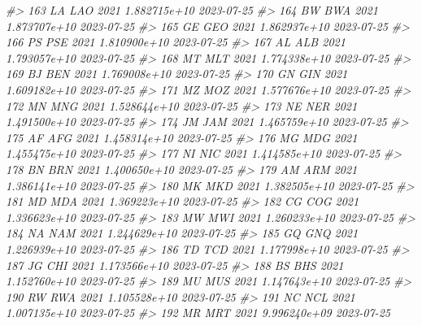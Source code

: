 \documentclass[
  xelatex, ja=standard]{bxjsbook}
\newenvironment{Shaded}{\begin{snugshade}}{\end{snugshade}}
\newcommand{\CommentTok}[1]{\textcolor[rgb]{0.56,0.35,0.01}{\textit{#1}}}
\theoremstyle{definition}
\theoremstyle{definition}
\theoremstyle{definition}
\theoremstyle{definition}
\theoremstyle{remark}
\begin{document}
\begin{Shaded}
\begin{Highlighting}[]
\CommentTok{\#\textgreater{} 163    LA   LAO 2021 1.882715e+10         2023{-}07{-}25}
\CommentTok{\#\textgreater{} 164    BW   BWA 2021 1.873707e+10         2023{-}07{-}25}
\CommentTok{\#\textgreater{} 165    GE   GEO 2021 1.862937e+10         2023{-}07{-}25}
\CommentTok{\#\textgreater{} 166    PS   PSE 2021 1.810900e+10         2023{-}07{-}25}
\CommentTok{\#\textgreater{} 167    AL   ALB 2021 1.793057e+10         2023{-}07{-}25}
\CommentTok{\#\textgreater{} 168    MT   MLT 2021 1.774338e+10         2023{-}07{-}25}
\CommentTok{\#\textgreater{} 169    BJ   BEN 2021 1.769008e+10         2023{-}07{-}25}
\CommentTok{\#\textgreater{} 170    GN   GIN 2021 1.609182e+10         2023{-}07{-}25}
\CommentTok{\#\textgreater{} 171    MZ   MOZ 2021 1.577676e+10         2023{-}07{-}25}
\CommentTok{\#\textgreater{} 172    MN   MNG 2021 1.528644e+10         2023{-}07{-}25}
\CommentTok{\#\textgreater{} 173    NE   NER 2021 1.491500e+10         2023{-}07{-}25}
\CommentTok{\#\textgreater{} 174    JM   JAM 2021 1.465759e+10         2023{-}07{-}25}
\CommentTok{\#\textgreater{} 175    AF   AFG 2021 1.458314e+10         2023{-}07{-}25}
\CommentTok{\#\textgreater{} 176    MG   MDG 2021 1.455475e+10         2023{-}07{-}25}
\CommentTok{\#\textgreater{} 177    NI   NIC 2021 1.414585e+10         2023{-}07{-}25}
\CommentTok{\#\textgreater{} 178    BN   BRN 2021 1.400650e+10         2023{-}07{-}25}
\CommentTok{\#\textgreater{} 179    AM   ARM 2021 1.386141e+10         2023{-}07{-}25}
\CommentTok{\#\textgreater{} 180    MK   MKD 2021 1.382505e+10         2023{-}07{-}25}
\CommentTok{\#\textgreater{} 181    MD   MDA 2021 1.369223e+10         2023{-}07{-}25}
\CommentTok{\#\textgreater{} 182    CG   COG 2021 1.336623e+10         2023{-}07{-}25}
\CommentTok{\#\textgreater{} 183    MW   MWI 2021 1.260233e+10         2023{-}07{-}25}
\CommentTok{\#\textgreater{} 184    NA   NAM 2021 1.244629e+10         2023{-}07{-}25}
\CommentTok{\#\textgreater{} 185    GQ   GNQ 2021 1.226939e+10         2023{-}07{-}25}
\CommentTok{\#\textgreater{} 186    TD   TCD 2021 1.177998e+10         2023{-}07{-}25}
\CommentTok{\#\textgreater{} 187    JG   CHI 2021 1.173566e+10         2023{-}07{-}25}
\CommentTok{\#\textgreater{} 188    BS   BHS 2021 1.152760e+10         2023{-}07{-}25}
\CommentTok{\#\textgreater{} 189    MU   MUS 2021 1.147643e+10         2023{-}07{-}25}
\CommentTok{\#\textgreater{} 190    RW   RWA 2021 1.105528e+10         2023{-}07{-}25}
\CommentTok{\#\textgreater{} 191    NC   NCL 2021 1.007135e+10         2023{-}07{-}25}
\CommentTok{\#\textgreater{} 192    MR   MRT 2021 9.996240e+09         2023{-}07{-}25}

\end{Highlighting}
\end{Shaded}
\end{document}
